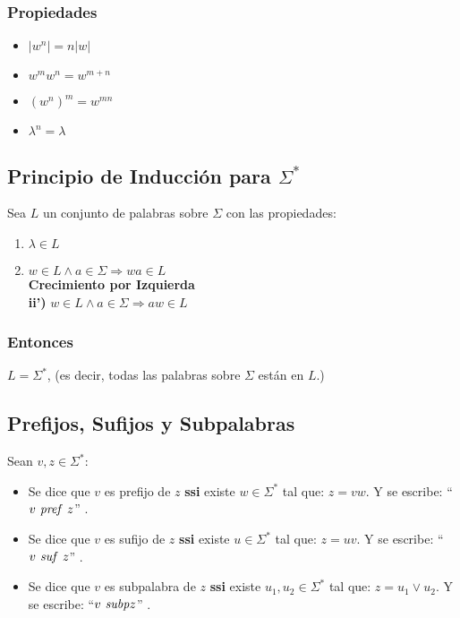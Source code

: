 \subsubsection{Propiedades}
\begin{itemize}
\item $|w^n| = n|w|$
\item $w^m w^n = w^{m+n}$
\item $(w^n)^m = w^{mn}$
\item $\lambda^n = \lambda$
\end{itemize}
\subsection{Principio de Inducción para $\Sigma^*$}
Sea $L$ un conjunto de palabras sobre $\Sigma$ con las propiedades:
\renewcommand{\labelenumi}{\theenumi}
\renewcommand{\theenumi}{\textbf{\roman{enumi}.)}}%
\begin{enumerate}
\item $\lambda \in L$
\item $w\in L \wedge a\in\Sigma \Rightarrow wa \in L$ \\${ }$\\
\textbf{Crecimiento por Izquierda} \\${ }$\\
\textbf{{\footnotesize ii')}} $w\in L \wedge a\in\Sigma \Rightarrow aw \in L$
\end{enumerate}
\subsubsection{Entonces}
$L=\Sigma^*$, (es decir, todas las palabras sobre $\Sigma$ están en $L$.)
\subsection{Prefijos, Sufijos y Subpalabras}
Sean $v,z \in \Sigma^*$:
\begin{itemize}
\item Se dice que $v$ es prefijo de $z$ \textbf{ssi} existe $w\in\Sigma^*$ tal que: $z=vw$. Y se escribe: ``$v \text{\textit{ pref }} z$'' .
\item Se dice que $v$ es sufijo de $z$ \textbf{ssi} existe $u\in\Sigma^*$ tal que: $z=uv$. Y se escribe: ``$v \text{\textit{ suf }} z$'' .
\item Se dice que $v$ es subpalabra de $z$ \textbf{ssi} existe $u_1,u_2\in\Sigma^*$ tal que: $z=u_1 \vee u_2$. Y se escribe: ``$v \text{\textit{ subp}} z$'' .
\end{itemize}


